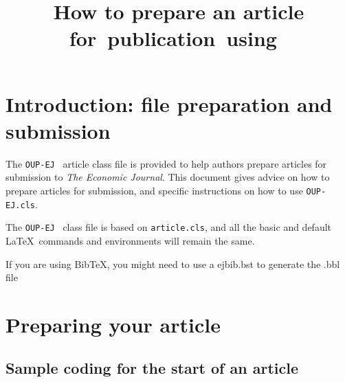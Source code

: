 \documentclass{OUP-EJ}
\begin{document}
\noshorttitletrue

\title[How to prepare an article for~publication~using~\LaTeXe]{How to prepare an article for~publication~using~\LaTeXe}

\maketitle

\section{Introduction: file preparation and submission}


The \verb"OUP-EJ" \LaTeXe\ article class file is provided to help authors prepare articles for submission to \textit{The Economic Journal}.
This document gives advice on how to prepare articles for submission, and specific instructions on how to use \verb"OUP-EJ.cls".

The \verb"OUP-EJ" \LaTeXe\ class file is based on \verb+article.cls+, and all the basic and default \LaTeX\ commands and environments will remain the same.


If you are using BibTeX, you might need to use a ejbib.bst to generate the .bbl file


\section{Preparing your article}

\subsection{Sample coding for the start of an article}\label{sec2}
\end{document}

